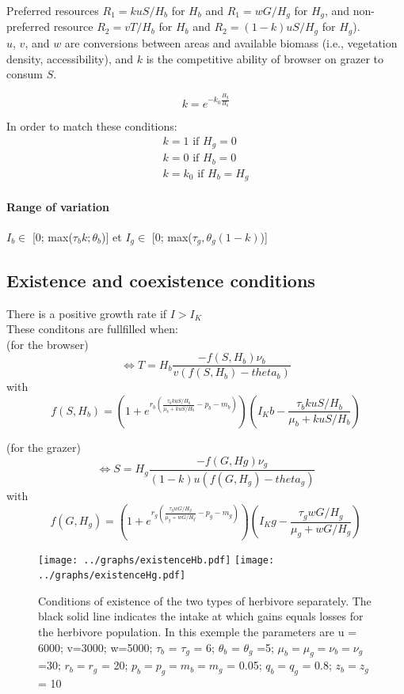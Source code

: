 Preferred resources $R_1 = kuS/H_b$ for $H_b$ and $R_1 = wG/H_g$ for $H_g$, and non-preferred resource $R_2=vT/H_b$ for $H_b$ and $R_2= (1-k)uS/H_g$ for $H_g$).\\

$u$, $v$, and $w$ are conversions between areas and available biomass (i.e., vegetation density, accessibility), and $k$ is the competitive ability of browser on grazer to consum $S$.

\[
k = e^{-k_0\frac{H_g}{H_b}}
\]

In order to match these conditions:
\[
\left.
\begin{array}{l}
k = 1 \text{ if } H_g=0\\
k = 0 \text{ if } H_b=0\\
k = k_0 \text{ if } H_b=H_g
\end{array}
\right.
\]


\paragraph{Range of variation}

$I_b \in$ [0; max($\tau_b k; \theta_b$)]
et
$I_g \in$ [0; max($\tau_g, \theta_g (1-k)$)]

\newpage
\subsection*{Existence and coexistence conditions}

There is a positive growth rate if $I>I_K$\\

These conditons are fullfilled when:\\

(for the browser) 
$$\iff T = H_b \frac{-f(S, H_b)\nu_b}{v(f(S, H_b)-theta_b)}$$ 
with $$f(S, H_b) = (1+e^{r_b(\frac{\tau_b kuS/H_b}{\mu_b+kuS/H_b} - p_b - m_b)} ) (I_Kb - \frac{\tau_b kuS/H_b}{\mu_b + kuS/H_b})$$

(for the grazer) 
$$\iff S = H_g \frac{-f(G, Hg)\nu_g}{(1-k)u(f(G, H_g)-theta_g)}$$
with $$f(G, H_g) = (1+e^{r_g(\frac{\tau_g wG/H_g}{\mu_g+wG/H_g} - p_g - m_g)} ) (I_Kg - \frac{\tau_g wG/H_g}{\mu_g + wG/H_g})$$

\begin{figure}[h]
\centering
\texttt{[image: ../graphs/existenceHb.pdf]}
\texttt{[image: ../graphs/existenceHg.pdf]}
  \caption{Conditions of existence of the two types of herbivore separately. The black solid line indicates the intake at which gains equals losses for the herbivore population. In this exemple the parameters are u = 6000; v=3000; w=5000; $\tau_b$ = $\tau_g$ = 6; $\theta_b$ = $\theta_g$ =5; $\mu_b = \mu_g = \nu_b = \nu_g$ =30; $r_b = r_g$ = 20; $p_b = p_g = m_b = m_g$ = 0.05; $q_b = q_g$ = 0.8; $z_b = z_g$ = 10}
\label{existenceH}
\end{figure}

